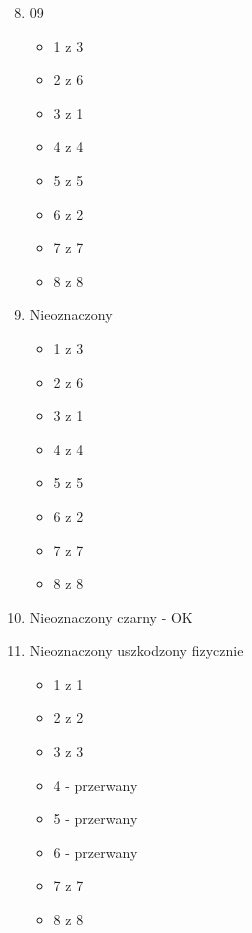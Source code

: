\documentclass{article}
\begin{document}
\begin{minipage}{0.4\textwidth}
  \begin{enumerate}
    \setcounter{enumi}{7}    
    
  \item 09
    \begin{itemize}
    \item 1 z 3
  \item 2 z 6
  \item 3 z 1
  \item 4 z 4
  \item 5 z 5
  \item 6 z 2
  \item 7 z 7
  \item 8 z 8
  \end{itemize}
\item Nieoznaczony
  \begin{itemize}
  \item 1 z 3
  \item 2 z 6
  \item 3 z 1
  \item 4 z 4
  \item 5 z 5
  \item 6 z 2
  \item 7 z 7
  \item 8 z 8
  \end{itemize}
\item Nieoznaczony czarny - OK
\item Nieoznaczony uszkodzony fizycznie
  \begin{itemize}
  \item 1 z 1
  \item 2 z 2
  \item 3 z 3
  \item 4 - przerwany
  \item 5 - przerwany
  \item 6 - przerwany
  \item 7 z 7
  \item 8 z 8
  \end{itemize}

\end{enumerate}
\end{minipage}
\newpage
\end{document}
